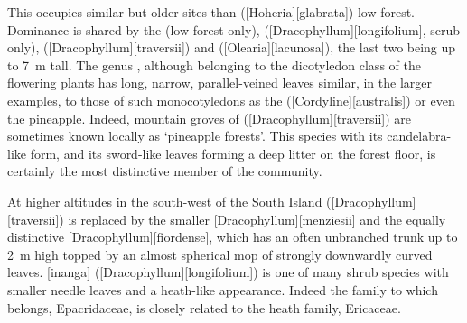 This occupies similar but older sites than  ([Hoheria][glabrata]) low forest.
Dominance is shared by the  (low forest only),  ([Dracophyllum][longifolium], scrub only),  ([Dracophyllum][traversii]) and  ([Olearia][lacunosa]), the last two being up to \SI{7}{\metre} tall.
The genus , although belonging to the dicotyledon class of the flowering plants has long, narrow, parallel-veined leaves similar, in the larger examples, to those of such monocotyledons as the  ([Cordyline][australis]) or even the pineapple.
Indeed, mountain groves of  ([Dracophyllum][traversii]) are sometimes known locally as `pineapple forests'.
This species with its candelabra-like form, and its sword-like leaves forming a deep litter on the forest floor, is certainly the most distinctive member of the community.

At higher altitudes in the south-west of the South Island  ([Dracophyllum][traversii]) is replaced by the smaller [Dracophyllum][menziesii] and the equally distinctive [Dracophyllum][fiordense], which has an often unbranched trunk up to \SI{2}{\metre} high topped by an almost spherical mop of strongly downwardly curved leaves. [inanga] ([Dracophyllum][longifolium]) is one of many shrub species with smaller needle leaves and a heath-like appearance.
Indeed the family to which  belongs, Epacridaceae, is closely related to the heath family, Ericaceae.

